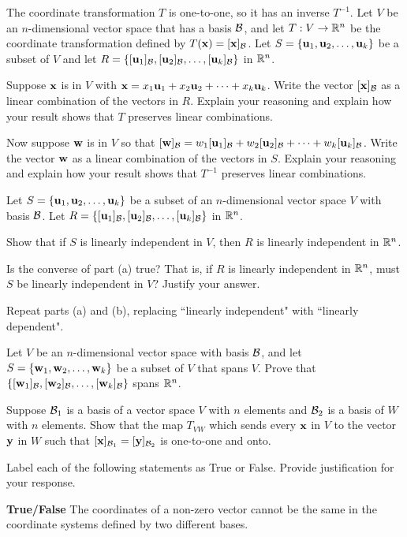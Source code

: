 \item The coordinate transformation $T$ is one-to-one, so it has an inverse $T^{-1}$. Let $V$ be an $n$-dimensional vector space that has a basis $\mathcal{B}$, and let $T : V \to \mathbb{R}^n$ be the coordinate transformation defined by $T(\mathbf{x}) = [\mathbf{x}]_{\mathcal{B}}$. Let $S = \{\mathbf{u}_1, \mathbf{u}_2, \ldots, \mathbf{u}_k\}$ be a subset of $V$ and let $R = \{[\mathbf{u}_1]_{\mathcal{B}}, [\mathbf{u}_2]_{\mathcal{B}}, \ldots, [\mathbf{u}_k]_{\mathcal{B}}\}$ in $\mathbb{R}^n$. 
	\ba
	\item Suppose $\mathbf{x}$ is in $V$ with $\mathbf{x} = x_1 \mathbf{u}_1 + x_2\mathbf{u}_2 + \cdots + x_k \mathbf{u}_k$. Write the vector $[\mathbf{x}]_{\mathcal{B}}$ as a linear combination of the vectors in $R$. Explain your reasoning and explain how your result shows that $T$ preserves linear combinations. 
	\item Now suppose $\mathbf{w}$ is in $V$ so that $[\mathbf{w}]_{\mathcal{B}} = w_1 [\mathbf{u}_1]_{\mathcal{B}} + w_2[\mathbf{u}_2]_{\mathcal{B}} + \cdots + w_k [\mathbf{u}_k]_{\mathcal{B}}$. Write the vector $\mathbf{w}$ as a linear combination of the vectors in $S$. Explain your reasoning and explain how your result shows that $T^{-1}$ preserves linear combinations. 
	\ea

\item Let $S = \{\mathbf{u}_1, \mathbf{u}_2, \ldots, \mathbf{u}_k\}$ be a subset of an $n$-dimensional vector space $V$ with basis $\mathcal{B}$. Let $R = \{[\mathbf{u}_1]_{\mathcal{B}}, [\mathbf{u}_2]_{\mathcal{B}}, \ldots, [\mathbf{u}_k]_{\mathcal{B}}\}$ in $\mathbb{R}^n$. 
	\ba
	\item Show that if $S$ is linearly independent in $V$, then $R$ is linearly independent in $\mathbb{R}^n$. 
	\item Is the converse of part (a) true? That is, if $R$ is linearly independent in $\mathbb{R}^n$, must $S$ be linearly independent in $V$? Justify your answer. 
	\item Repeat parts (a) and (b), replacing ``linearly independent" with ``linearly dependent". 
	\ea
	
\item Let $V$ be an $n$-dimensional vector space with basis $\mathcal{B}$, and let $S=\{\mathbf{w}_1, \mathbf{w}_2, \ldots, \mathbf{w}_k\}$ be a subset of $V$ that spans $V$. Prove that $\{[\mathbf{w}_1]_{\mathcal{B}}, [\mathbf{w}_2]_{\mathcal{B}}, \ldots, [\mathbf{w}_k]_{\mathcal{B}}\}$ spans $\mathbb{R}^n$.

\item \label{ex:5_d_T_VW} Suppose $\mathcal{B}_1$ is a basis of a vector space $V$ with $n$ elements and $\mathcal{B}_2$ is a basis of $W$ with $n$ elements. Show that the map $T_{VW}$ which sends every $\mathbf{x}$ in $V$ to the vector $\mathbf{y}$ in $W$ such that $[\mathbf{x}]_{\mathcal{B}_1} = [\mathbf{y}]_{\mathcal{B}_2}$ is one-to-one and onto. 

\item Label each of the following statements as True or False. Provide justification for your response.
\ba
\item \textbf{True/False} The coordinates of a non-zero vector cannot be the same in the coordinate systems defined by two different bases.

